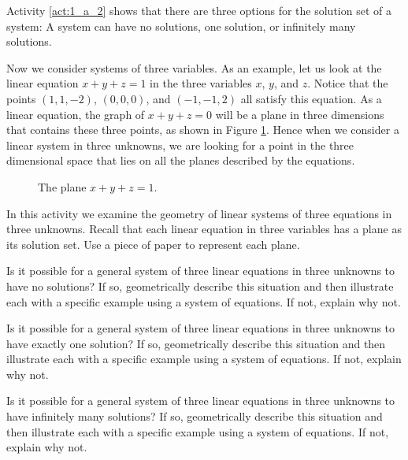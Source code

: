 Activity \ref{act:1_a_2} shows that there are three options for the solution set of a system: A system can have no solutions, one solution, or infinitely many solutions.


Now we consider systems of three variables. As an example, let us look at the linear equation $x+y+z=1$ in the three variables $x$, $y$, and $z$. Notice that the points $(1,1,-2)$, $(0,0,0)$, and $(-1,-1,2)$ all satisfy this equation. As a linear equation, the graph of $x+y+z=0$ will be a plane in three dimensions that contains these three points, as shown in Figure \ref{F:1_a_plane}. Hence when we consider a linear system in three unknowns, we are looking for a point in the three dimensional space that lies on all the planes described by the equations. 

\begin{figure}[h]
\begin{center}
\caption{The plane $x+y+z=1$.}
\label{F:1_a_plane}
\end{center}
\end{figure}

\begin{activity} \label{act:1_a_3} In this activity we examine the geometry of linear systems of three equations in three unknowns. Recall that each linear equation in three variables has a plane as its solution set. Use a piece of paper to represent each plane. 
\ba
\item Is it possible for a general system of three linear equations in three unknowns to have no solutions? If so, geometrically describe this situation and then illustrate each with a specific example using a system of equations. If not, explain why not.


\item Is it possible for a general system of three linear equations in three unknowns to have exactly one solution? If so, geometrically describe this situation and then illustrate each with a specific example using a system of equations. If not, explain why not.
 

\item Is it possible for a general system of three linear equations in three unknowns to have infinitely many solutions? If so, geometrically describe this situation and then illustrate each with a specific example using a system of equations. If not, explain why not.

 


\ea

\end{activity}


